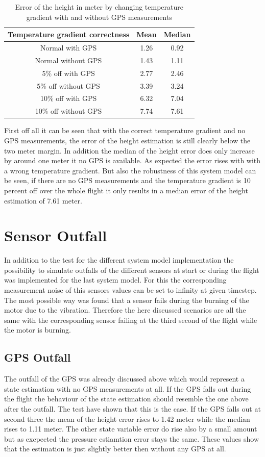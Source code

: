 \begin{table}[h!]
\centering
\begin{tabular}{ccc}
\hline
\multicolumn{1}{|c|}{Temperature gradient correctness} & \multicolumn{1}{|c|}{Mean}& \multicolumn{1}{|c|}{Median} \\ \hline
Normal with GPS 	& 1.26 		& 0.92\\
Normal without GPS	& 1.43	 	& 1.11\\
5\% off with GPS 	& 2.77	 	& 2.46\\
5\% off without GPS 	& 3.39	 	& 3.24\\
10\% off with GPS 	& 6.32	 	& 7.04\\
10\% off without GPS 	& 7.74 		& 7.61
\end{tabular}
\caption{Error of the height in meter by changing temperature gradient with and without GPS measurements}
\label{tab:ErrorChangingTempGradWithWithoutGPS}
\end{table}

First off all it can be seen that with the correct temperature gradient and no GPS measurements,
the error of the height estimation is still clearly below the two meter margin.
In addition the median of the height error does only increase by around one meter it no GPS is available.
As expected the error rises with with a wrong temperature gradient.
But also the robustness of this system model can be seen, if there are no GPS measurements
and the temperature gradient is 10 percent off over the whole flight it only results in a median error of the height estimation of 7.61 meter.

\section{Sensor Outfall}
In addition to the test for the different system model implementation
the possibility to simulate outfalls of the different sensors at start or during the flight was implemented for the last system model.
For this the corresponding measurement noise of this sensors values can be set to infinity at given timestep.
The most possible way was found that a sensor fails during the burning of the motor due to the vibration.
Therefore the here discussed scenarios are all the same with the corresponding sensor failing at the third second of the flight while the motor is burning.

\subsection{GPS Outfall}
The outfall of the GPS was already discussed above which would represent a state estimation with no GPS measurements at all.
If the GPS falls out during the flight the behaviour of the state estimation should resemble the one above after the outfall.
The test have shown that this is the case.
If the GPS falls out at second three the mean of the height error rises to 1.42 meter while the median rises to 1.11 meter.
The other state variable error do rise also by a small amount but as excpected the pressure estiamtion error stays the same.
These values show that the estimation is just slightly better then without any GPS at all.

